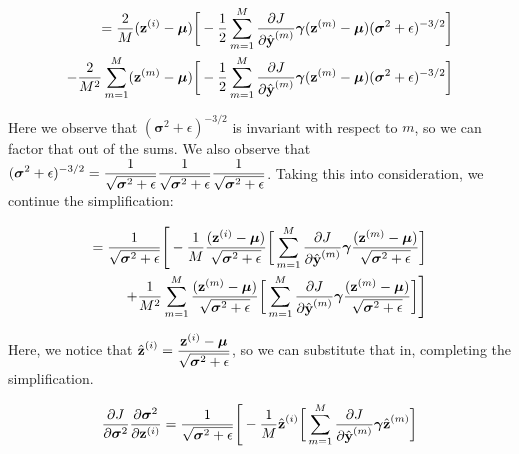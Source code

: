 \documentclass{article}
\begin{document}
\begin{multicols*}{2}
$$ \begin{aligned}
    = {2 \over M} (\textbf{z}^{(i)} - \boldsymbol{\mu}) \bigg[
    -{1\over 2}
    \sum_{m = 1}^M {\partial J \over \partial \hat{\textbf{y}}^{(m)}} 
    \boldsymbol{\gamma}
    (\textbf{z}^{(m)} - \boldsymbol{\mu}) (\boldsymbol{\sigma}^2 + \epsilon)^{-3/2} \bigg]\\
    -{2 \over M^2} \sum_{m=1}^M (\textbf{z}^{(m)} - \boldsymbol{\mu})
    \bigg[
    -{1\over 2}
    \sum_{m = 1}^M {\partial J \over \partial \hat{\textbf{y}}^{(m)}} 
    \boldsymbol{\gamma}
    (\textbf{z}^{(m)} - \boldsymbol{\mu}) (\boldsymbol{\sigma}^2 + \epsilon)^{-3/2} \bigg]
\end{aligned}$$

Here we observe that $(\boldsymbol{\sigma}^2 + \epsilon)^{-3/2}$ is invariant 
with respect to $m$, so we can factor that out of the sums. We also observe
that $\begin{aligned}
    (\boldsymbol{\sigma}^2 + \epsilon)^{-3/2} = 
    {1\over \sqrt{\boldsymbol{\sigma}^2 + \epsilon}}
    {1\over \sqrt{\boldsymbol{\sigma}^2 + \epsilon}}
    {1\over \sqrt{\boldsymbol{\sigma}^2 + \epsilon}}
\end{aligned}$. Taking this into consideration, we continue the simplification:

$$\begin{aligned}
    = {1 \over \sqrt{\boldsymbol{\sigma}^2 + \epsilon}}\Bigg[-{1 \over M} {(\textbf{z}^{(i)} - \boldsymbol{\mu})\over \sqrt{\boldsymbol{\sigma}^2 + \epsilon}} \bigg[
        \sum_{m = 1}^M {\partial J \over \partial \hat{\textbf{y}}^{(m)}} 
        \boldsymbol{\gamma}
        {(\textbf{z}^{(m)} - \boldsymbol{\mu})\over \sqrt{\boldsymbol{\sigma}^2 + \epsilon}} \bigg]\\
        +{1 \over M^2} \sum_{m=1}^M {(\textbf{z}^{(m)} - \boldsymbol{\mu})\over \sqrt{\boldsymbol{\sigma}^2 + \epsilon}}
        \bigg[
        \sum_{m = 1}^M {\partial J \over \partial \hat{\textbf{y}}^{(m)}} 
        \boldsymbol{\gamma}
        {(\textbf{z}^{(m)} - \boldsymbol{\mu})\over \sqrt{\boldsymbol{\sigma}^2 + \epsilon}}\bigg]\Bigg]
\end{aligned}$$

Here, we notice that $\begin{aligned}
    \hat{\textbf{z}}^{(i)} = {\textbf{z}^{(i)} - \boldsymbol{\mu} \over \sqrt{\boldsymbol{\sigma}^2 + \epsilon}}
\end{aligned}$, so we can substitute that in, completing the simplification.

$$\begin{aligned}
    {\partial J \over \partial \boldsymbol{\sigma}^2} 
    {\partial \boldsymbol{\sigma}^2 \over \partial \textbf{z}^{(i)}}
    = {1 \over \sqrt{\boldsymbol{\sigma}^2 + \epsilon}}\Bigg[-{1 \over M} \hat{\textbf{z}}^{(i)} \bigg[
        \sum_{m = 1}^M {\partial J \over \partial \hat{\textbf{y}}^{(m)}} 
        \boldsymbol{\gamma}
        \hat{\textbf{z}}^{(m)} \bigg]
\end{aligned}$$


\end{multicols*}
\end{document}
